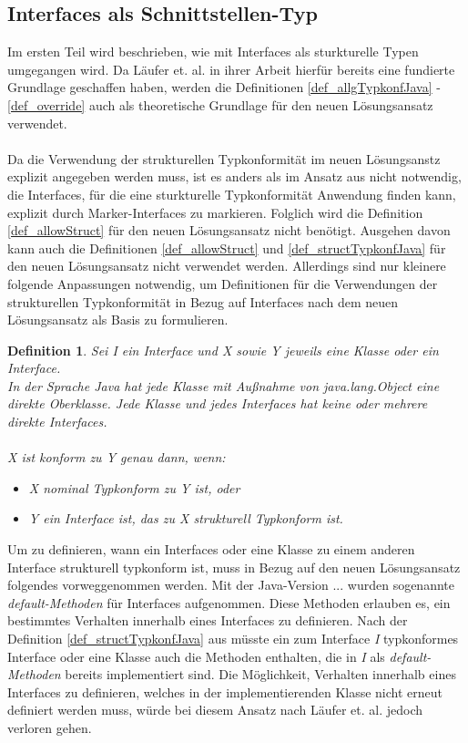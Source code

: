 \documentclass[11pt, 
ngerman,
doublespacing,
chapterinoneline, %
consistentlayout, %
]{scrartcl}
\newtheorem{definition}{Definition}
\begin{document}
\subsection{Interfaces als Schnittstellen-Typ}
Im ersten Teil wird beschrieben, wie mit Interfaces als sturkturelle Typen umgegangen wird. Da Läufer et. al. \cite{structconfjava} in ihrer Arbeit hierfür bereits eine fundierte Grundlage geschaffen haben, werden die Definitionen \ref{def_allgTypkonfJava} - \ref{def_override} auch als theoretische Grundlage für den neuen Lösungsansatz verwendet.\\\\
Da die Verwendung der strukturellen Typkonformität im neuen Lösungsanstz explizit angegeben werden muss, ist es anders als im Ansatz aus \cite{structconfjava} nicht notwendig, die Interfaces, für die eine sturkturelle Typkonformität Anwendung finden kann, explizit durch Marker-Interfaces zu markieren. Folglich wird die Definition \ref{def_allowStruct} für den neuen Lösungsansatz nicht benötigt. Ausgehen davon kann auch die Definitionen \ref{def_allowStruct} und \ref{def_structTypkonfJava} für den neuen Lösungsansatz nicht verwendet werden. Allerdings sind nur kleinere folgende Anpassungen notwendig, um Definitionen für die Verwendungen der strukturellen Typkonformität in Bezug auf  Interfaces nach dem neuen Lösungsansatz als Basis zu formulieren.
\begin{definition}\label{def_allgTypkonfJava_V1}
Sei \emph{I} ein Interface und \emph{X} sowie \emph{Y} jeweils eine Klasse oder ein Interface.\\
In der Sprache Java hat jede Klasse mit Außnahme von \emph{java.lang.Object} eine direkte Oberklasse. Jede Klasse und jedes Interfaces hat keine oder mehrere direkte Interfaces.\\\\
\emph{X} ist konform zu \emph{Y} genau dann, wenn:
\begin{itemize}
\item\emph{X} nominal Typkonform zu \emph{Y} ist, oder
\item\emph{Y} ein Interface ist, das zu \emph{X} strukturell Typkonform ist.
\end{itemize}
\end{definition}
Um zu definieren, wann ein Interfaces oder eine Klasse zu einem anderen Interface strukturell typkonform ist, muss in Bezug auf den neuen Lösungsansatz folgendes vorweggenommen werden. Mit der Java-Version ... wurden sogenannte \emph{default-Methoden} für Interfaces aufgenommen. Diese Methoden erlauben es, ein bestimmtes Verhalten innerhalb eines Interfaces zu definieren. Nach der Definition \ref{def_structTypkonfJava} aus \cite{structconfjava} müsste ein zum Interface \emph{I} typkonformes Interface oder eine Klasse auch die Methoden enthalten, die in \emph{I} als \emph{default-Methoden} bereits implementiert sind. Die Möglichkeit, Verhalten innerhalb eines Interfaces zu definieren, welches in der implementierenden Klasse nicht erneut definiert werden muss, würde bei diesem Ansatz nach Läufer et. al. \cite{structconfjava} jedoch verloren gehen.\\\\
\end{document}
